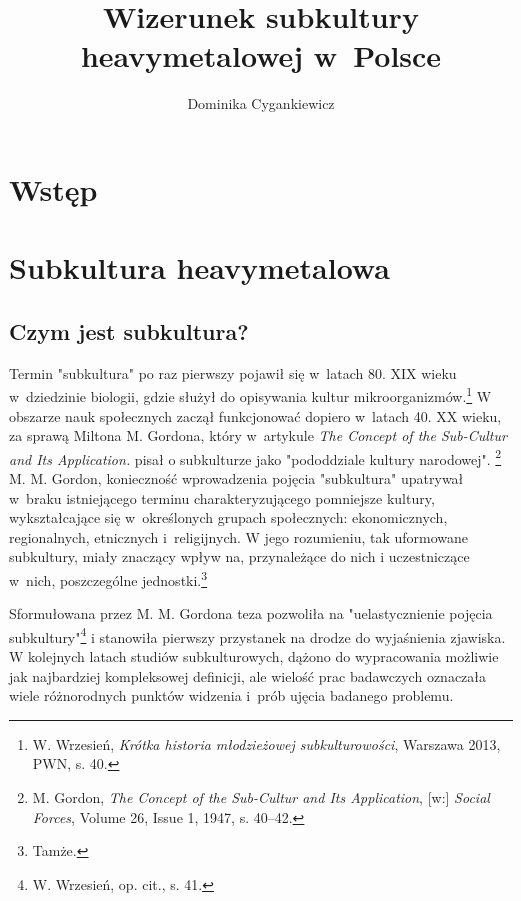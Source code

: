 \documentclass[12pt, a4paper, titlepage]{report}
\author{Dominika Cygankiewicz}
\title{\textbf{Wizerunek subkultury heavymetalowej w~Polsce}}
\date{}
\begin{document}
	
\maketitle
\tableofcontents
\thispagestyle {empty}
\newpage

\chapter*{Wstęp}

\chapter{Subkultura heavymetalowa}
\section{Czym jest subkultura?}
Termin "subkultura" po raz pierwszy pojawił się w~latach 80. XIX wieku w~dziedzinie biologii, gdzie służył do opisywania kultur mikroorganizmów.\footnote{W. Wrzesień, \textit{Krótka historia młodzieżowej subkulturowości}, Warszawa 2013, PWN, s. 40.} W obszarze nauk społecznych zaczął funkcjonować dopiero w~latach 40. XX wieku, za sprawą Miltona M. Gordona, który w~artykule \textit{The Concept of the Sub-Cultur and Its Application.} pisał o subkulturze jako "pododdziale kultury narodowej". \footnote{M. Gordon, \textit{The Concept of the Sub-Cultur and Its Application}, [w:] \textit{Social Forces}, Volume 26, Issue 1, 1947, s. 40–42.} M. M. Gordon, konieczność wprowadzenia pojęcia "subkultura" upatrywał w~braku istniejącego terminu charakteryzującego pomniejsze kultury, wykształcające się w~określonych grupach społecznych: ekonomicznych, regionalnych, etnicznych i~religijnych. W jego rozumieniu, tak uformowane subkultury, miały znaczący wpływ na, przynależące do nich i uczestniczące w~nich, poszczególne jednostki.\footnote{Tamże.} %


Sformułowana przez M. M. Gordona teza pozwoliła na "uelastycznienie pojęcia subkultury"\footnote{W. Wrzesień, op. cit., s. 41.} i stanowiła pierwszy przystanek na drodze do wyjaśnienia zjawiska. W kolejnych latach studiów subkulturowych, dążono do wypracowania możliwie jak najbardziej kompleksowej definicji, ale wielość prac badawczych oznaczała wiele różnorodnych punktów widzenia i~prób ujęcia badanego problemu. 
\end{document}
